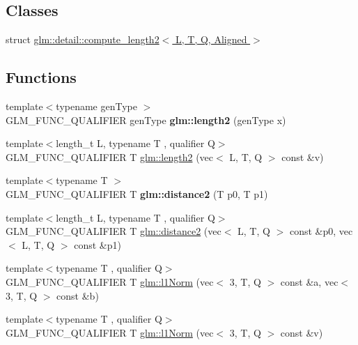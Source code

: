 \subsection*{Classes}
\begin{DoxyCompactItemize}
\item 
struct \hyperlink{structglm_1_1detail_1_1compute__length2}{glm\+::detail\+::compute\+\_\+length2$<$ L, T, Q, Aligned $>$}
\end{DoxyCompactItemize}
\subsection*{Functions}
\begin{DoxyCompactItemize}
\item 
\mbox{\label{norm_8inl_a115f7e8a1d545b9e97b05d4be5ad491d}} 
{\footnotesize template$<$typename gen\+Type $>$ }\\G\+L\+M\+\_\+\+F\+U\+N\+C\+\_\+\+Q\+U\+A\+L\+I\+F\+I\+ER gen\+Type {\bfseries glm\+::length2} (gen\+Type x)
\item 
{\footnotesize template$<$length\+\_\+t L, typename T , qualifier Q$>$ }\\G\+L\+M\+\_\+\+F\+U\+N\+C\+\_\+\+Q\+U\+A\+L\+I\+F\+I\+ER T \hyperlink{group__gtx__norm_ga8d1789651050adb7024917984b41c3de}{glm\+::length2} (vec$<$ L, T, Q $>$ const \&v)
\item 
\mbox{\label{norm_8inl_a109e6f3d69b13cc1ce23a83103601ab0}} 
{\footnotesize template$<$typename T $>$ }\\G\+L\+M\+\_\+\+F\+U\+N\+C\+\_\+\+Q\+U\+A\+L\+I\+F\+I\+ER T {\bfseries glm\+::distance2} (T p0, T p1)
\item 
{\footnotesize template$<$length\+\_\+t L, typename T , qualifier Q$>$ }\\G\+L\+M\+\_\+\+F\+U\+N\+C\+\_\+\+Q\+U\+A\+L\+I\+F\+I\+ER T \hyperlink{group__gtx__norm_ga85660f1b79f66c09c7b5a6f80e68c89f}{glm\+::distance2} (vec$<$ L, T, Q $>$ const \&p0, vec$<$ L, T, Q $>$ const \&p1)
\item 
{\footnotesize template$<$typename T , qualifier Q$>$ }\\G\+L\+M\+\_\+\+F\+U\+N\+C\+\_\+\+Q\+U\+A\+L\+I\+F\+I\+ER T \hyperlink{group__gtx__norm_gae2fc0b2aa967bebfd6a244700bff6997}{glm\+::l1\+Norm} (vec$<$ 3, T, Q $>$ const \&a, vec$<$ 3, T, Q $>$ const \&b)
\item 
{\footnotesize template$<$typename T , qualifier Q$>$ }\\G\+L\+M\+\_\+\+F\+U\+N\+C\+\_\+\+Q\+U\+A\+L\+I\+F\+I\+ER T \hyperlink{group__gtx__norm_ga1a7491e2037ceeb37f83ce41addfc0be}{glm\+::l1\+Norm} (vec$<$ 3, T, Q $>$ const \&v)

\end{DoxyCompactItemize}
